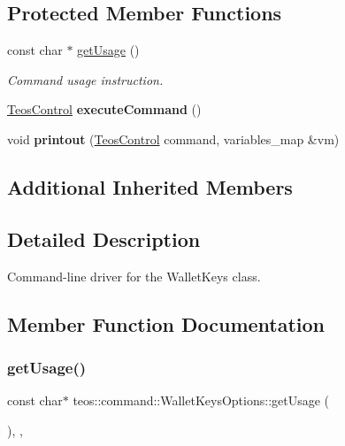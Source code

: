 \subsection*{Protected Member Functions}
\begin{DoxyCompactItemize}
\item 
const char $\ast$ \mbox{\hyperlink{classteos_1_1command_1_1_wallet_keys_options_a40097f0265580b2c3cdaad721f5cef09}{get\+Usage}} ()
\begin{DoxyCompactList}\small\item\em Command \textquotesingle{}usage\textquotesingle{} instruction. \end{DoxyCompactList}\item 
\mbox{\label{classteos_1_1command_1_1_wallet_keys_options_a959256e35b2f9eaa25ecb86ac97ae34a}} 
\mbox{\hyperlink{classteos_1_1_teos_control}{Teos\+Control}} {\bfseries execute\+Command} ()
\item 
\mbox{\label{classteos_1_1command_1_1_wallet_keys_options_a6fa9db5a2e144c8ab07a4876372e76e7}} 
void {\bfseries printout} (\mbox{\hyperlink{classteos_1_1_teos_control}{Teos\+Control}} command, variables\+\_\+map \&vm)
\end{DoxyCompactItemize}
\subsection*{Additional Inherited Members}


\subsection{Detailed Description}
Command-\/line driver for the Wallet\+Keys class. 

\subsection{Member Function Documentation}
\mbox{\label{classteos_1_1command_1_1_wallet_keys_options_a40097f0265580b2c3cdaad721f5cef09}} 
\subsubsection{\texorpdfstring{get\+Usage()}{getUsage()}}
{\footnotesize\ttfamily const char$\ast$ teos\+::command\+::\+Wallet\+Keys\+Options\+::get\+Usage (\begin{DoxyParamCaption}{ }\end{DoxyParamCaption})\hspace{0.3cm}{\ttfamily [inline]}, {\ttfamily [protected]}, {\ttfamily [virtual]}}



